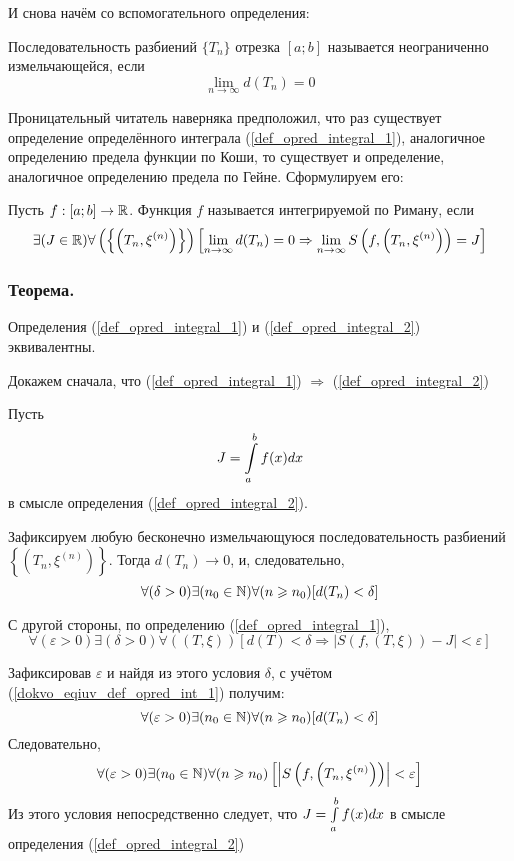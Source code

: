 И снова начём со вспомогательного определения:

\opred
Последовательность разбиений $\{T_n\}$ отрезка $[a;b]$ называется неограниченно измельчающейся, если 
$$\lim_{n\to\infty}d(T_n) = 0$$

Проницательный читатель наверняка предположил, что раз существует определение определённого интеграла (\ref{def_opred_integral_1}), аналогичное определению предела функции по Коши, то существует и определение, аналогичное определению предела по Гейне. Сформулируем его:

\opred
Пусть $f:[a;b]\to \mathbb{R}$. Функция $f$ называется интегрируемой по Риману, если
\begin{equation}\label{def_opred_integral_2}
\exists(J\in\mathbb{R})\forall\left(\left\{\left(T_n,\xi^{(n)}\right)\right\}\right)
\left[\lim_{n\to\infty}d(T_n) = 0 \Rightarrow \lim_{n\to\infty}S\left(f,\left(T_n,\xi^{(n)}\right)\right)=J\right]
\end{equation}

\subsubsection{Теорема.}
Определения (\ref{def_opred_integral_1}) и (\ref{def_opred_integral_2}) эквивалентны.

Докажем сначала, что (\ref{def_opred_integral_1}) $\Rightarrow$ (\ref{def_opred_integral_2})

\dokvo
Пусть $$J=\int\limits_a^b f(x) dx $$ в смысле определения (\ref{def_opred_integral_2}).

Зафиксируем любую бесконечно измельчающуюся последовательность разбиений $\left\{\left( T_n, \xi^{(n)}\right)\right\}$. Тогда $d(T_n)\to 0$, и, следовательно,
\begin{equation}\label{dokvo_eqiuv_def_opred_int_1}
\forall(\delta>0)\exists(n_0\in\mathbb{N})\forall(n\geqslant n_0)[d(T_n)<\delta]
\end{equation}

С другой стороны, по определению (\ref{def_opred_integral_1}),
$$
\forall(\varepsilon>0)\exists(\delta>0)\forall((T,\xi))[d(T)<\delta \Rightarrow |S(f,(T,\xi))-J|<\varepsilon]
$$

Зафиксировав $\varepsilon$ и найдя из этого условия $\delta$, с учётом (\ref{dokvo_eqiuv_def_opred_int_1}) получим:
$$
\forall(\varepsilon>0)\exists(n_0\in\mathbb{N})\forall(n\geqslant n_0)[d(T_n)<\delta]
$$
Следовательно,
$$
\forall(\varepsilon>0)\exists(n_0\in\mathbb{N})\forall(n\geqslant n_0)\left[\left|S\left(f,\left(T_n,\xi^{(n)}\right)\right)\right|<\varepsilon\right]
$$
Из этого условия непосредственно следует, что $J=\int\limits_a^b f(x) dx$ в смысле определения (\ref{def_opred_integral_2})

